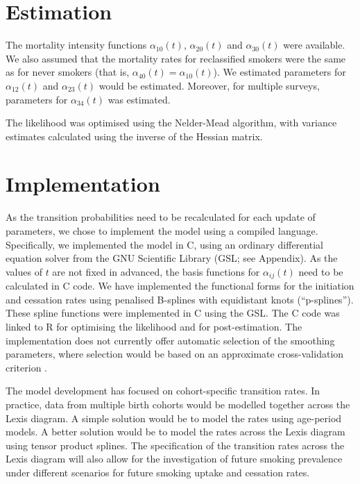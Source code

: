 \documentclass[11pt,a4paper]{article}
\begin{document}
\section{Estimation}

The mortality intensity functions $\alpha_{10}(t)$, $\alpha_{20}(t)$
and $\alpha_{30}(t)$ were available. We also assumed that the
mortality rates for reclassified smokers were the same as for never
smokers (that is, $\alpha_{40}(t)=\alpha_{10}(t)$). We estimated
parameters for $\alpha_{12}(t)$ and $\alpha_{23}(t)$ would be
estimated. Moreover, for multiple surveys, parameters for
$\alpha_{34}(t)$ was estimated.

The likelihood was optimised using the Nelder-Mead algorithm, with variance estimates calculated using the inverse of the Hessian matrix.



\section{Implementation}

As the transition probabilities need to be recalculated for each
update of parameters, we chose to implement the model using a compiled
language. Specifically, we implemented the model in C, using an
ordinary differential equation solver from the GNU Scientific Library
(GSL; see Appendix). As the values of $t$ are not fixed in advanced,
the basis functions for $\alpha_{ij}(t)$ need to be calculated in C
code.  We have implemented the functional forms for the initiation and
cessation rates using penalised B-splines with equidistant knots
(``p-splines''). These spline functions were implemented in C using
the GSL.  The C code was linked to R for optimising the likelihood and
for post-estimation.  The implementation does not currently offer
automatic selection of the smoothing parameters, where selection would
be based on an approximate cross-validation criterion
\cite[e.g.][]{joly_penalized_2002,cai_hazard_2003}.

The model development has focused on cohort-specific transition rates.
In practice, data from multiple birth cohorts would be modelled
together across the Lexis diagram. A simple solution would be to model
the rates using age-period models. A better solution would be to model
the rates across the Lexis diagram using tensor product splines.
The specification of the transition rates across the Lexis diagram
will also allow for the investigation of future smoking prevalence
under different scenarios for future smoking uptake and cessation rates.
\end{document}

